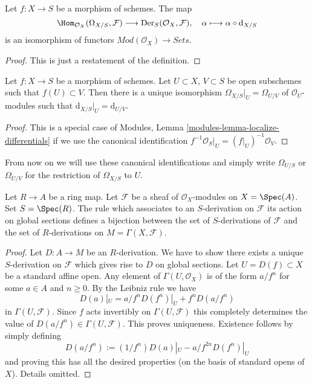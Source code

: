 \begin{lemma}
\label{lemma-universal-derivation-universal}
Let $f : X \to S$ be a morphism of schemes. The map
$$
\Hom_{\mathcal{O}_X}(\Omega_{X/S}, \mathcal{F})
\longrightarrow
\text{Der}_S(\mathcal{O}_X, \mathcal{F}),\quad
\alpha \longmapsto \alpha \circ \text{d}_{X/S}
$$
is an isomorphism of functors $\textit{Mod}(\mathcal{O}_X) \to \textit{Sets}$.
\end{lemma}

\begin{proof}
This is just a restatement of the definition.
\end{proof}

\begin{lemma}
\label{lemma-differentials-restrict-open}
Let $f : X \to S$ be a morphism of schemes.
Let $U \subset X$, $V \subset S$ be open subschemes such
that $f(U) \subset V$. Then there is a unique isomorphism
$\Omega_{X/S}|_U = \Omega_{U/V}$ of $\mathcal{O}_U$-modules such that
$\text{d}_{X/S}|_U = \text{d}_{U/V}$.
\end{lemma}

\begin{proof}
This is a special case of
Modules, Lemma \ref{modules-lemma-localize-differentials}
if we use the canonical identification
$f^{-1}\mathcal{O}_S|_U = (f|_U)^{-1}\mathcal{O}_V$.
\end{proof}

\noindent
From now on we will use these canonical identifications and simply
write $\Omega_{U/S}$ or $\Omega_{U/V}$ for the restriction of
$\Omega_{X/S}$ to $U$.

\begin{lemma}
\label{lemma-affine-case-derivation}
Let $R \to A$ be a ring map. Let $\mathcal{F}$
be a sheaf of $\mathcal{O}_X$-modules
on $X = \Spec(A)$. Set $S = \Spec(R)$.
The rule which associates to an $S$-derivation on $\mathcal{F}$
its action on global sections defines a bijection between
the set of $S$-derivations of $\mathcal{F}$ and the set of
$R$-derivations on $M = \Gamma(X, \mathcal{F})$.
\end{lemma}

\begin{proof}
Let $D : A \to M$ be an $R$-derivation. We have to show there exists
a unique $S$-derivation on $\mathcal{F}$ which gives rise to
$D$ on global sections. Let $U = D(f) \subset X$ be a standard affine open.
Any element of $\Gamma(U, \mathcal{O}_X)$ is of the form
$a/f^n$ for some $a \in A$ and $n \geq 0$. By the Leibniz rule
we have
$$
D(a)|_U = a/f^n D(f^n)|_U + f^n D(a/f^n)
$$
in $\Gamma(U, \mathcal{F})$. Since $f$ acts invertibly
on $\Gamma(U, \mathcal{F})$ this completely determines
the value of $D(a/f^n) \in \Gamma(U, \mathcal{F})$.
This proves uniqueness. Existence follows by simply defining
$$
D(a/f^n) := (1/f^n) D(a)|_U - a/f^{2n} D(f^n)|_U
$$
and proving this has all the desired properties (on the basis
of standard opens of $X$). Details omitted.
\end{proof}


